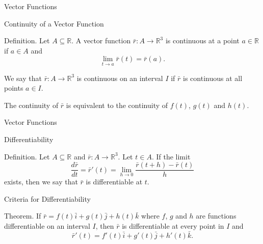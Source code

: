 \documentclass{beamer}
\begin{document}
    \begin{frame}[t]{Vector Functions}
        \begin{block}{Continuity of a Vector Function}
            \par \textcolor{yy}{Definition.} Let $A \subseteq \mathbb{R}$. A vector function $\bar{r}: A \to \mathbb{R}^3$ is \textcolor{yy}{continuous} at a point $a \in \mathbb{R}$ if $a \in A$ and 
            \begin{equation*}
                \lim\limits_{t \to a}\bar{r} (t) = \bar{r} (a).
            \end{equation*}

            \phantom{zjy}

            \par We say that $\bar{r}: A \to \mathbb{R}^3$ is \textcolor{yy}{continuous on an interval} $I$ if $\bar{r}$ is continuous at all points $a \in I$.
            \par The continuity of $\bar{r}$ is equivalent to the continuity of $f(t)$, $g(t)$ and $h(t)$.
        \end{block}
    \end{frame}

    \begin{frame}[t]{Vector Functions}
        \begin{block}{Differentiability}
            \par \textcolor{yy}{Definition.} Let $A \subseteq \mathbb{R}$ and $\bar{r}: A \to \mathbb{R}^3$. Let $t \in A$. If the limit
            \begin{equation*}
                \dfrac{d \bar{r}}{dt} = \bar{r}'(t) = \lim\limits_{h \to 0} \dfrac{\bar{r}(t+h) - \bar{r}(t)}{h}
            \end{equation*}
            exists, then we say that $\bar{r}$ is \textcolor{yy}{differentiable} at $t$.
        \end{block}

        \begin{block}{Criteria for Differentiability}
            \par \textcolor{yy}{Theorem.} If $\bar{r} = f(t) \bar{i} + g(t) \bar{j} + h(t) \bar{k}$ where $f$, $g$ and $h$ are functions differentiable on an interval $I$, then $\bar{r}$ is differentiable at every point in $I$ and 
            \begin{equation*}
                \bar{r}'(t) = f'(t) \bar{i} + g'(t) \bar{j} + h'(t) \bar{k} .
            \end{equation*}
        \end{block}
    \end{frame}
\end{document}
